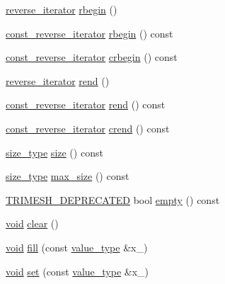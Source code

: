 \begin{DoxyCompactItemize}
\item 
\hyperlink{classtrimesh_1_1Vec_a42a460e6f54561faf9975298d46807ec}{reverse\+\_\+iterator} \hyperlink{classtrimesh_1_1Vec_a0e0c475283b1fd98ecf59c4f508f0f91}{rbegin} ()
\item 
\hyperlink{classtrimesh_1_1Vec_a0f78ea50431013f8f15b6286efc0dccd}{const\+\_\+reverse\+\_\+iterator} \hyperlink{classtrimesh_1_1Vec_a08f4c9e0e39010805c6e21aca0fa0a8f}{rbegin} () const
\item 
\hyperlink{classtrimesh_1_1Vec_a0f78ea50431013f8f15b6286efc0dccd}{const\+\_\+reverse\+\_\+iterator} \hyperlink{classtrimesh_1_1Vec_a1be25873280d141661ec3b79c84df7a0}{crbegin} () const
\item 
\hyperlink{classtrimesh_1_1Vec_a42a460e6f54561faf9975298d46807ec}{reverse\+\_\+iterator} \hyperlink{classtrimesh_1_1Vec_acac7354cecf1d803c5d168ca0acfea57}{rend} ()
\item 
\hyperlink{classtrimesh_1_1Vec_a0f78ea50431013f8f15b6286efc0dccd}{const\+\_\+reverse\+\_\+iterator} \hyperlink{classtrimesh_1_1Vec_aa5fa2f2e3aaf736dacaa6b715b6338cb}{rend} () const
\item 
\hyperlink{classtrimesh_1_1Vec_a0f78ea50431013f8f15b6286efc0dccd}{const\+\_\+reverse\+\_\+iterator} \hyperlink{classtrimesh_1_1Vec_a4d64e3c76e262f365340a34429a76232}{crend} () const
\item 
\hyperlink{classtrimesh_1_1Vec_a65397e05ed96e7723cf2d54dfff0ad0a}{size\+\_\+type} \hyperlink{classtrimesh_1_1Vec_a5244372932950795782c00aa7149e5e6}{size} () const
\item 
\hyperlink{classtrimesh_1_1Vec_a65397e05ed96e7723cf2d54dfff0ad0a}{size\+\_\+type} \hyperlink{classtrimesh_1_1Vec_ae3bae37a0f378cd5dc29e138f1352b50}{max\+\_\+size} () const
\item 
\hyperlink{mathutil_8h_a642ee87acd19a9b33be6b7955d3dfcaa}{T\+R\+I\+M\+E\+S\+H\+\_\+\+D\+E\+P\+R\+E\+C\+A\+T\+ED} bool \hyperlink{classtrimesh_1_1Vec_ab6045de61bcc7373f2810c48499dfd4c}{empty} () const
\item 
\hyperlink{namespacetrimesh_a784ddfd979e1c579bda795a8edfc3f43}{void} \hyperlink{classtrimesh_1_1Vec_ae6f4ee2f93b293f9382b0ee66993cc72}{clear} ()
\item 
\hyperlink{namespacetrimesh_a784ddfd979e1c579bda795a8edfc3f43}{void} \hyperlink{classtrimesh_1_1Vec_a2f4ba7e8355dac052256b11bf46ead69}{fill} (const \hyperlink{classtrimesh_1_1Vec_a10a59253996e42d67c713f37592669df}{value\+\_\+type} \&x\+\_\+)
\item 
\hyperlink{namespacetrimesh_a784ddfd979e1c579bda795a8edfc3f43}{void} \hyperlink{classtrimesh_1_1Vec_ab65be30cd5fe17ca7222b4d3eaf9e0aa}{set} (const \hyperlink{classtrimesh_1_1Vec_a10a59253996e42d67c713f37592669df}{value\+\_\+type} \&x\+\_\+)

\end{DoxyCompactItemize}
